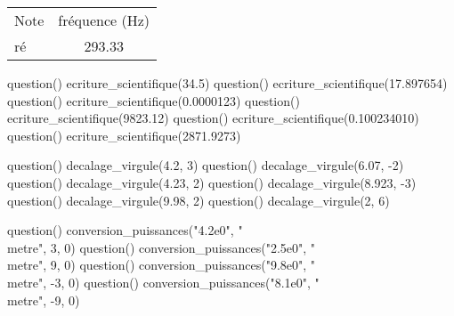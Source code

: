 \documentclass[../Cours.tex]{subfiles}
\begin{document}
\begin{questions}
        \begin{center}
            \begin{tabularx}{0.5\linewidth}{|l|C|}
                Note & fréquence (\unit{\hertz}) \\
                ré & \num{293.33} \\
                
            \end{tabularx}
        \end{center}


        
\end{questions}

\clearpage
\CORRECTIONS
\begin{questions}
    \vspace{-1.5em}
    \begin{multicols}{2}
    \begin{luacode}
        question() ecriture_scientifique(34.5)
        question() ecriture_scientifique(17.897654)
        question() ecriture_scientifique(0.0000123)
        question() ecriture_scientifique(9823.12)
        question() ecriture_scientifique(0.100234010)
        question() ecriture_scientifique(2871.9273)
    \end{luacode}
    \end{multicols}
    
    \vspace{-1.5em}
    \begin{multicols}{2}
    \begin{luacode}
        question() decalage_virgule(4.2, 3)
        question() decalage_virgule(6.07, -2)
        question() decalage_virgule(4.23, 2)
        question() decalage_virgule(8.923, -3)
        question() decalage_virgule(9.98, 2)
        question() decalage_virgule(2, 6)
    \end{luacode}
    \end{multicols}
    
    \begin{luacode}
        question() conversion_puissances("4.2e0", "\\metre", 3, 0)
        question() conversion_puissances("2.5e0", "\\metre", 9, 0)
        question() conversion_puissances("9.8e0", "\\metre", -3, 0)
        question() conversion_puissances("8.1e0", "\\metre", -9, 0)
    \end{luacode}
    

\end{questions}
\end{document}
